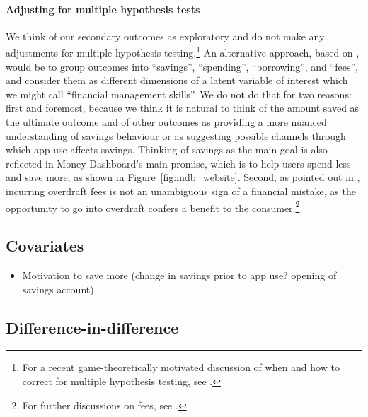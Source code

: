 \paragraph{Adjusting for multiple hypothesis tests}%
\label{par:adjusting_for_multiple_hypothesis_tests}
We think of our secondary outcomes as exploratory and do not make any
adjustments for multiple hypothesis testing.\footnote{For a recent
game-theoretically motivated discussion of when and how to correct for multiple
hypothesis testing, see \citet{viviano2021should}.} An alternative approach,
based on \citet{anderson2008multiple}, would be to group outcomes into
``savings'', ``spending'', ``borrowing'', and ``fees'', and consider them as
different dimensions of a latent variable of interest which we might call
``financial management skills''. We do not do that for two reasons: first and
foremost, because we think it is natural to think of the amount saved as the
ultimate outcome and of other outcomes as providing a more nuanced
understanding of savings behaviour or as suggesting possible channels through
which app use affects savings. Thinking of savings as the main goal is also
reflected in Money Dashboard's main promise, which is to help users spend less
and save more, as shown in Figure~\ref{fig:mdb_website}. Second, as pointed out
in \citet{carlin2017fintech}, incurring overdraft fees is not an unambiguous
sign of a financial mistake, as the opportunity to go into overdraft confers a
benefit to the consumer.\footnote{For further discussions on fees, see
\citet{jorring2020financial, stango2009consumers}.}


\subsection{Covariates}%
\label{sub:covariates}

\begin{itemize}
    \item Motivation to save more (change in savings prior to app use? opening
        of savings account)
\end{itemize}


\subsection{Difference-in-difference}%
\label{sub:difference_in_difference}

